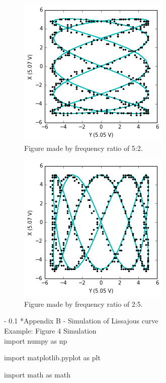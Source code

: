 \documentclass[twoside]{article}
\makeatletter
\renewcommand\section{\@startsection
   {section}{1}{0pt}%
   {-\baselineskip}%
   {0.1\baselineskip}%
   {\normalfont\large\bfseries}}%
\makeatother
\begin{document}
\begin{figure}[h!]
\centering
\includegraphics[scale=0.5]{1to2fifths}
\caption{ Figure made by frequency ratio of 5:2.}
\label{fig:oscilloscope}
\end{figure}

\begin{figure}[h!]
\centering
\includegraphics[scale=0.5]{1to5halves}
\caption{ Figure made by frequency ratio of 2:5.}
\label{fig:oscilloscope}
\end{figure}

\newpage

 \section*{Appendix B - Simulation of Lissajous curve }
 \label{sec:appendixB}
 \hspace{1cm}\\
Example: Figure 4 Simulation\\

import numpy as np

import matplotlib.pyplot as plt

import math as math\\
\end{document}
